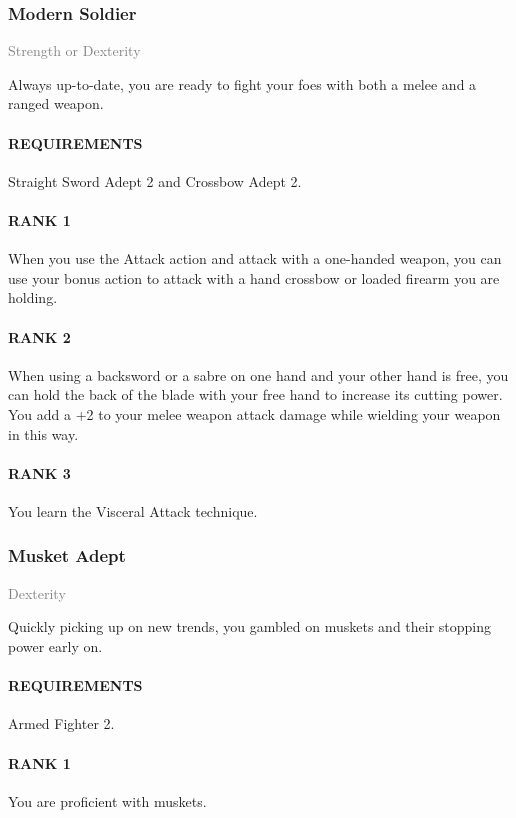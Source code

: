 \subsubsection{Modern Soldier} \label{feat::modernsoldier}
\small{\textcolor{gray}{Strength or Dexterity}}

\normalsize
Always up-to-date, you are ready to fight your foes with both a melee and a ranged weapon.
\paragraph{REQUIREMENTS} Straight Sword Adept 2 and Crossbow Adept 2.
\paragraph{RANK 1} When you use the Attack action and attack with a one-handed weapon, you can use your bonus action to attack with a hand crossbow or loaded firearm you are holding.
\paragraph{RANK 2} When using a backsword or a sabre on one hand and your other hand is free, you can hold the back of the blade with your free hand to increase its cutting power.
You add a +2 to your melee weapon attack damage while wielding your weapon in this way.
\paragraph{RANK 3} You learn the Visceral Attack technique.

\subsubsection{Musket Adept} \label{feat::musketadept}
\small{\textcolor{gray}{Dexterity}}

\normalsize
Quickly picking up on new trends, you gambled on muskets and their stopping power early on.
\paragraph{REQUIREMENTS} Armed Fighter 2.
\paragraph{RANK 1} You are proficient with muskets.
